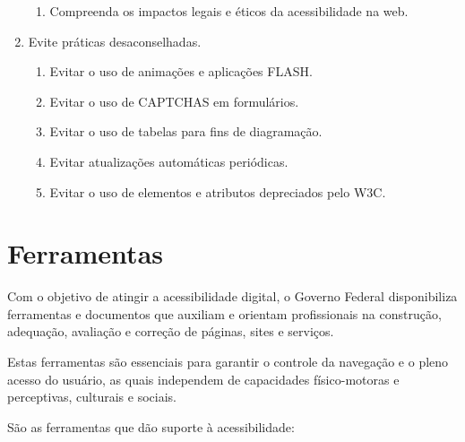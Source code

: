 \documentclass[
  12pt,
  openright,
  twoside,
  a4paper,
  english,
  french,
  spanish,
  brazil
]{abntex2}
\begin{document}
\begin{enumerate}
\begin{enumerate}
    \item Compreenda os impactos legais e éticos da acessibilidade na web.
  \end{enumerate}
  \item Evite práticas desaconselhadas.
  \begin{enumerate}
    \item Evitar o uso de animações e aplicações FLASH.
    \item Evitar o uso de CAPTCHAS em formulários.
    \item Evitar o uso de tabelas para fins de diagramação.
    \item Evitar atualizações automáticas periódicas.
    \item Evitar o uso de elementos e atributos depreciados pelo W3C.
  \end{enumerate}
\end{enumerate}

\chapter{Ferramentas}

Com o objetivo de atingir a acessibilidade digital, o Governo Federal
disponibiliza ferramentas e documentos que auxiliam e orientam profissionais na
construção, adequação, avaliação e correção de páginas, sites e serviços.

Estas ferramentas são essenciais para garantir o controle da navegação e o pleno
acesso do usuário, as quais independem de capacidades físico-motoras e
perceptivas, culturais e sociais.

São as ferramentas que dão suporte à acessibilidade:
\end{document}
